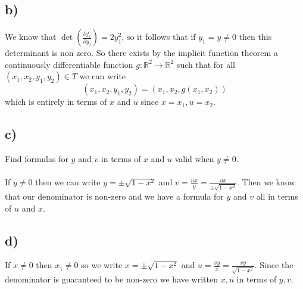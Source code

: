 \documentclass{article}
\theoremstyle{definition}
\begin{document}
\subsection*{b)}
We know that $\det \left(\frac{\partial f_i}{\partial y_j}\right) = 2y_1^2$, so it follows that if $y_1 = y \neq 0$
then this determinant is non zero. So there exists by the implicit function theorem a continuously differentiable function $g: \mathbb{R}^2 \rightarrow \mathbb{R}^2$
such that for all $(x_1,x_2,y_1,y_2) \in T$ we can write 
\[
    (x_1,x_2,y_1,y_2) = (x_1,x_2,g(x_1,x_2))
\]
which is entirely in terms of $x$ and $u$ since $x = x_1, u = x_2$.
\subsection*{c)}
Find formulas for $y$ and $v$ in terms of $x$ and $u$ valid when $y \neq 0$.\\\\
If $y \neq 0$ then we can write $y = \pm \sqrt{1-x^2}$ and $v = \frac{ux}{y} = \frac{ux}{\pm \sqrt{1-x^2}}$.
Then we know that our denominator is non-zero and we have a formula for $y$ and $v$ all in terms of $u$ and $x$.
\subsection*{d)}
If $x \neq 0$ then $x_1 \neq 0$ so we write $x = \pm \sqrt{1-x^2}$ and $u = \frac{vy}{x} = \frac{vy}{\sqrt{1-x^2}}$.
Since the denominator is guaranteed to be non-zero we have written $x,u$ in terms of $y,v$.
\end{document}
